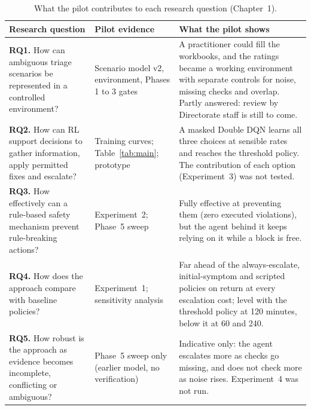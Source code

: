 \documentclass[11pt,a4paper]{article}
\begin{document}
\begin{table}[H]
\centering\small
\caption{What the pilot contributes to each research question (Chapter~1).}
\label{tab:rq}
\begin{tabularx}{\linewidth}{@{}>{\raggedright\arraybackslash}p{4.6cm}>{\raggedright\arraybackslash}p{2.3cm}L@{}}
\toprule
Research question & Pilot evidence & What the pilot shows \\
\midrule
\textbf{RQ1.} How can ambiguous triage scenarios be represented in a controlled environment? & Scenario model v2, environment, Phases 1 to 3 gates & A practitioner could fill the workbooks, and the ratings became a working environment with separate controls for noise, missing checks and overlap. Partly answered: review by Directorate staff is still to come. \\
\addlinespace
\textbf{RQ2.} How can RL support decisions to gather information, apply permitted fixes and escalate? & Training curves; Table~\ref{tab:main}; prototype & A masked Double DQN learns all three choices at sensible rates and reaches the threshold policy. The contribution of each option (Experiment~3) was not tested. \\
\addlinespace
\textbf{RQ3.} How effectively can a rule-based safety mechanism prevent rule-breaking actions? & Experiment~2; Phase~5 sweep & Fully effective at preventing them (zero executed violations), but the agent behind it keeps relying on it while a block is free. \\
\addlinespace
\textbf{RQ4.} How does the approach compare with baseline policies? & Experiment~1; sensitivity analysis & Far ahead of the always-escalate, initial-symptom and scripted policies on return at every escalation cost; level with the threshold policy at 120 minutes, below it at 60 and 240. \\
\addlinespace
\textbf{RQ5.} How robust is the approach as evidence becomes incomplete, conflicting or ambiguous? & Phase~5 sweep only (earlier model, no verification) & Indicative only: the agent escalates more as checks go missing, and does not check more as noise rises. Experiment~4 was not run. \\
\bottomrule
\end{tabularx}
\end{table}
\end{document}
